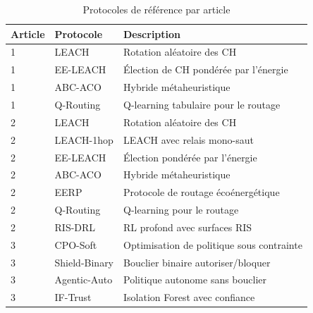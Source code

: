 \begin{table}[htb]
\centering
\caption{Protocoles de référence par article}
\label{tab:baselines}
\begin{tabular}{llp{3in}}
\toprule
\textbf{Article} & \textbf{Protocole} & \textbf{Description} \\
\midrule
1 & LEACH & Rotation aléatoire des CH \\
1 & EE-LEACH & Élection de CH pondérée par l'énergie \\
1 & ABC-ACO & Hybride métaheuristique \\
1 & Q-Routing & Q-learning tabulaire pour le routage \\
\midrule
2 & LEACH & Rotation aléatoire des CH \\
2 & LEACH-1hop & LEACH avec relais mono-saut \\
2 & EE-LEACH & Élection pondérée par l'énergie \\
2 & ABC-ACO & Hybride métaheuristique \\
2 & EERP & Protocole de routage écoénergétique \\
2 & Q-Routing & Q-learning pour le routage \\
2 & RIS-DRL & RL profond avec surfaces RIS \\
\midrule
3 & CPO-Soft & Optimisation de politique sous contrainte \\
3 & Shield-Binary & Bouclier binaire autoriser/bloquer \\
3 & Agentic-Auto & Politique autonome sans bouclier \\
3 & IF-Trust & Isolation Forest avec confiance \\
\bottomrule
\end{tabular}
\end{table}


